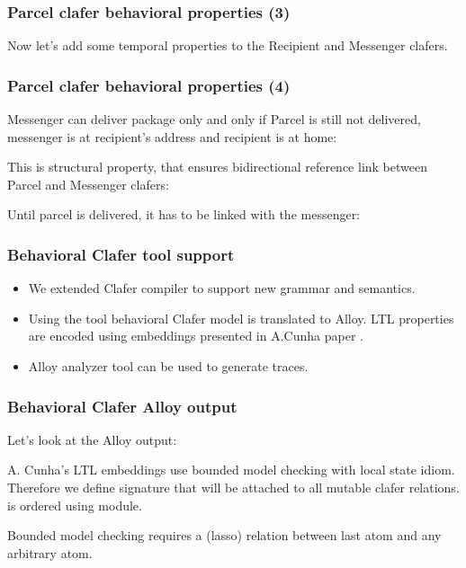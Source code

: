 \documentclass[xcolor=dvipsnames,mathserif,12pt,backend=biber]{beamer}
\begin{document}
  \begin{frame}
    \frametitle{Parcel clafer behavioral properties (3)}
    Now let's add some temporal properties to the Recipient and Messenger clafers.
    
  \end{frame}

  \begin{frame}
    \frametitle{Parcel clafer behavioral properties (4)}
    Messenger can deliver package only and only if Parcel is still not delivered, messenger is at recipient's address and recipient is at home:
    
    This is structural property, that ensures bidirectional reference link between Parcel and Messenger clafers:
    
    Until parcel is delivered, it has to be linked with the messenger:
    
  \end{frame}

  \begin{frame}
    \frametitle{Behavioral Clafer tool support}
    \begin{itemize}
      \item{We extended Clafer compiler to support new grammar and semantics.}
      \item{Using the tool behavioral Clafer model is translated to Alloy. LTL properties are encoded using embeddings presented in A.Cunha paper .}
      \item{Alloy analyzer tool can be used to generate traces.}
      \end{itemize}
  \end{frame}

  \begin{frame}
    \frametitle{Behavioral Clafer Alloy output}
    Let's look at the Alloy output:
    
    
    A. Cunha's LTL embeddings use bounded model checking with local state idiom. Therefore we define  signature that will be attached to all mutable clafer relations.  is ordered using  module.
    
    Bounded model checking requires a  (lasso) relation between last  atom and any arbitrary  atom.
  \end{frame}
\end{document}
